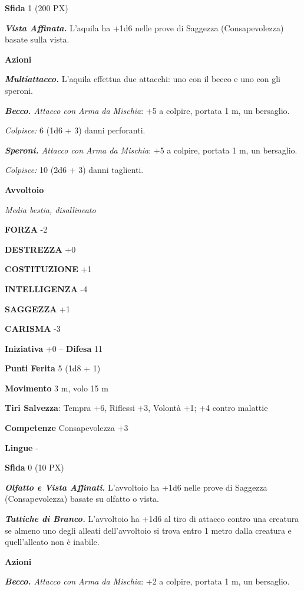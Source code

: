\begin{multicols}{2}
\textbf{Sfida} 1 (200 PX)

\textit{\textbf{Vista Affinata.}} L'aquila ha +1d6 nelle prove di Saggezza (Consapevolezza) basate sulla vista.

\textbf{Azioni}

\textit{\textbf{Multiattacco.}} L'aquila effettua due attacchi: uno con il becco e uno con gli speroni.

\textit{\textbf{Becco.} Attacco con Arma da Mischia}: +5 a colpire, portata 1 m, un bersaglio.

\textit{Colpisce:} 6 (1d6 + 3) danni perforanti.

\textit{\textbf{Speroni.} Attacco con Arma da Mischia}: +5 a colpire, portata 1 m, un bersaglio.

\textit{Colpisce:} 10 (2d6 + 3) danni taglienti.

\medskip\textbf{Avvoltoio}

\textit{Media bestia, disallineato}

\textbf{FORZA} -2

\textbf{DESTREZZA} +0

\textbf{COSTITUZIONE} +1

\textbf{INTELLIGENZA} -4

\textbf{SAGGEZZA} +1

\textbf{CARISMA} -3

\textbf{Iniziativa} +0 -- \textbf{Difesa} 11

\textbf{Punti Ferita} 5 (1d8 + 1)

\textbf{Movimento} 3 m, volo 15 m

\textbf{Tiri Salvezza}: Tempra +6, Riflessi +3, Volontà +1; +4 contro malattie

\textbf{Competenze} Consapevolezza +3

\textbf{Lingue} -

\textbf{Sfida} 0 (10 PX)

\textit{\textbf{Olfatto e Vista Affinati.}} L'avvoltoio ha +1d6 nelle prove di Saggezza (Consapevolezza) basate su olfatto o vista.

\textit{\textbf{Tattiche di Branco.}} L'avvoltoio ha +1d6 al tiro di attacco contro una creatura se almeno uno degli alleati dell'avvoltoio si trova entro 1 metro dalla creatura e quell'alleato non è inabile.

\textbf{Azioni}

\textit{\textbf{Becco.} Attacco con Arma da Mischia}: +2 a colpire, portata 1 m, un bersaglio.


\end{multicols}
